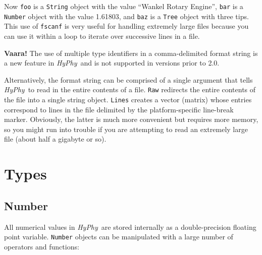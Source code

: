 \documentclass[12pt,twoside,openright]{book}
\newcommand{\hyphy}{\textit{HyPhy}}
\begin{document}
\noindent Now {\tt foo} is a {\tt String} object with the value ``Wankel Rotary Engine'', {\tt bar} is a {\tt Number} object with the value 1.61803, and {\tt baz} is a {\tt Tree} object with three tips.  This use of {\tt fscanf} is very useful for handling extremely large files because you can use it within a loop to iterate over successive lines in a file.

\begin{framed}
\vspace*{-1ex}
\noindent
\textdbend\hspace{1ex}
\small
\textbf{Vaara!}  The use of multiple type identifiers in a comma-delimited format string is a new feature in \hyphy\ and is not supported in versions prior to 2.0.
\end{framed}

Alternatively, the format string can be comprised of a single argument that tells \hyphy\ to read in the entire contents of a file.  {\tt Raw} redirects the entire contents of the file into a single string object.  {\tt Lines} creates a vector (matrix) whose entries correspond to lines in the file delimited by the platform-specific line-break marker.  Obviously, the latter is much more convenient but requires more memory, so you might run into trouble if you are attempting to read an extremely large file (about half a gigabyte or so).



\section {Types}\label{types}

\subsection {Number}

All numerical values in \hyphy\ are stored internally as a double-precision floating point variable.  {\tt Number} objects can be manipulated with a large number of operators and functions:
\end{document}
